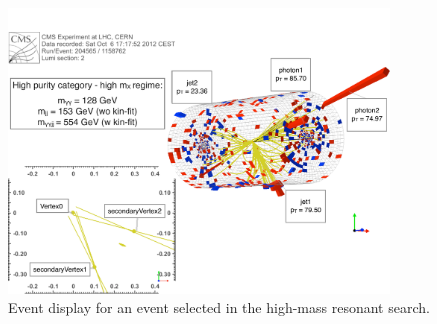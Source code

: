 \begin{figure}[ht]
 \begin{center}
   \includegraphics[width=0.9\textwidth]{figures/selection/display_evtHighMass.pdf}
 \end{center}
\caption{Event display for an event selected in the high-mass resonant search.}
\label{fig:display_highmass}
\end{figure}


